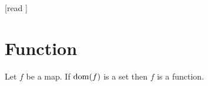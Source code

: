 \documentclass[10pt]{article}
\begin{document}
  \begin{imports}
    \begin{forthel}
      [read ]
    \end{forthel}
  \end{imports}


  \section{Function}

  \begin{forthel}
    \begin{axiom}[title=Function Axiom,id=FOUNDATIONS_10_7781693549182976,printid]
      Let $f$ be a map.
      If $\operatorname{dom}(f)$ is a set then $f$ is a function.
    \end{axiom}
  \end{forthel}
\end{document}
